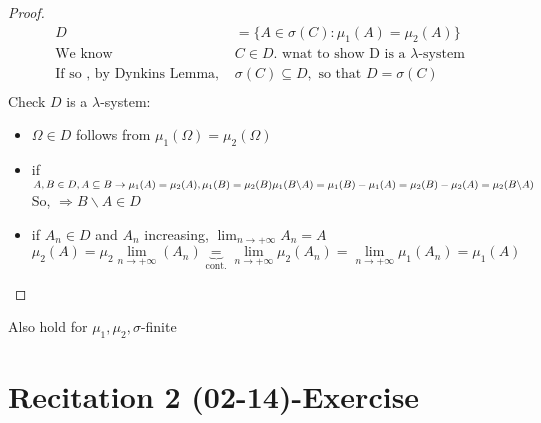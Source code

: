  \begin{proof}
    \begin{align*}{}{}
    D&=\{A\in\sigma(C):\mu_1(A)=\mu_2(A)\}\\
\text{We know } &C\in D. \text{ wnat to show D is a } \lambda\text{-system}\\
\text{If so , by Dynkins Lemma, }&\sigma(C)\subseteq D,\text{ so that }D=\sigma(C)\\
    \end{align*}
    Check $ D $ is a $ \lambda $-system:
    \begin{itemize}
    \item $ \Omega\in D $ follows from $ \mu_1(\Omega)=\mu_2(\Omega) $
    \item if $ A,B\in D, A\subseteq B  \rightarrow \mu_1(A)=\mu_2(A),\mu_1(B)=\mu_2(B) \\
    \mu_1(B\backslash A)=\mu_1(B)-\mu_1(A)=\mu_2(B)-\mu_2(A)=\mu_2(B\backslash A) $\\
    So, $\Rightarrow B\backslash A\in D$
    \item if $ A_n\in D $ and $ A_n $ increasing, $ \lim_{n\rightarrow+\infty}A_n=A $\\
    $$
        \mu_2(A)=\mu_2\lim_{n\rightarrow+\infty}(A_n)\underbrace{=}_{\text{cont.}}\lim_{n\rightarrow+\infty}\mu_2(A_n)=\lim_{n\rightarrow+\infty}\mu_1(A_n)=\mu_1(A)
    $$   
    \end{itemize}
 \end{proof}
 \begin{remark}[]{}
 Also hold for $ \mu_1,\mu_2 ,\sigma$-finite
 \end{remark}

 \section{Recitation 2 (02-14)-Exercise}
